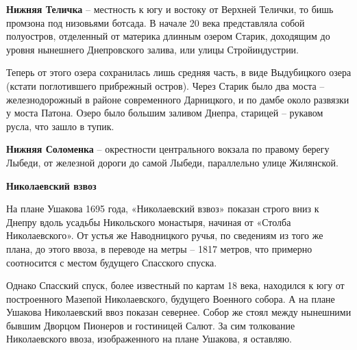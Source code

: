 \medskip


\textbf{Нижняя Теличка} – местность к югу и востоку от Верхней Телички, то бишь промзона под низовьями ботсада. В начале 20 века представляла собой полуостров, отделенный от материка длинным озером Старик, доходящим до уровня нынешнего Днепровского залива, или улицы Стройиндустрии. 

Теперь от этого озера сохранилась лишь средняя часть, в виде Выдубицкого озера (кстати поглотившего прибрежный остров). Через Старик было два моста – железнодорожный в районе современного Дарницкого, и по дамбе около развязки у моста Патона. Озеро было большим заливом Днепра, старицей – рукавом русла, что зашло в тупик.\\


\medskip

\textbf{Нижняя Соломенка} – окрестности центра\-льного вокзала по правому берегу Лыбеди, от железной дороги до самой Лыбеди, параллельно улице Жилянской.\\


\medskip

\textbf{Николаевский взвоз}

На плане Ушакова 1695 года, «Николаевский взвоз» показан строго вниз к Днепру вдоль усадьбы Никольского монастыря, начиная от «Столба Николаевского». От устья же Наводницкого ручья, по сведениям из того же плана, до этого ввоза, в переводе на метры – 1817 метров, что примерно соотносится с местом будущего Спасского спуска. 

Однако Спасский спуск, более известный по картам 18 века, находился к югу от построенного Мазепой Николаевского, будущего Военного собора. А на плане Ушакова Николаевский ввоз показан севернее. Собор же стоял между нынешними бывшим Дворцом Пионеров и гостиницей Салют. За сим толкование Николаевского ввоза, изображенного на плане Ушакова, я оставляю. \\


\medskip







